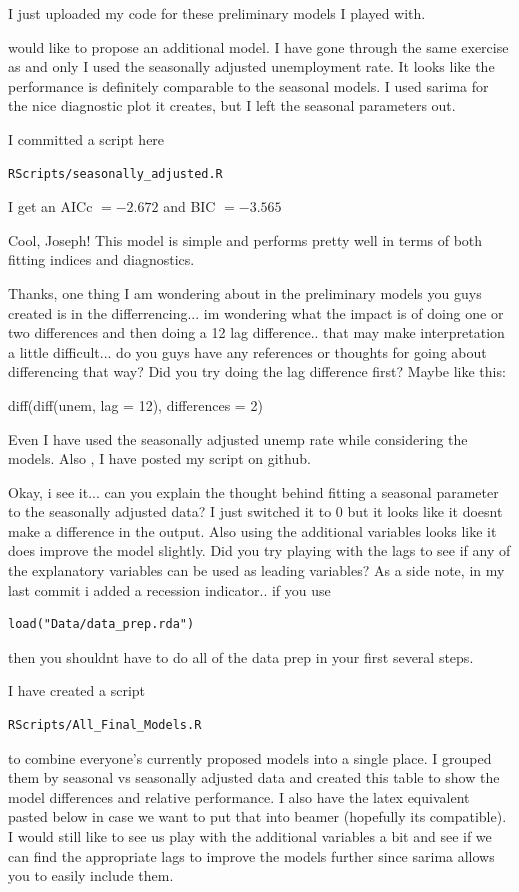 \documentclass[twoside,twocolumn]{article}
\begin{document}
I just uploaded my code for these preliminary models I played with.


 would like to propose an additional model. I have gone through the same exercise as  and \@bopangpsy only I used the seasonally adjusted unemployment rate. It looks like the performance is definitely comparable to the seasonal models. I used sarima for the nice diagnostic plot it creates, but I left the seasonal parameters out.

I committed a script here \begin{verbatim}RScripts/seasonally_adjusted.R\end{verbatim}

I get an AICc \(= -2.672\) and BIC \(= -3.565\)

Cool, Joseph! This model is simple and performs pretty well in terms of
both fitting indices and diagnostics.



Thanks, one thing I am wondering about in the preliminary models you guys created is in the differrencing... im wondering what the impact is of doing one or two differences and then doing a 12 lag difference.. that may make interpretation a little difficult... do you guys have any references or thoughts for going about differencing that way? Did you try doing the lag difference first? Maybe like this:

diff(diff(unem, lag = 12), differences = 2)

Even I have used the seasonally adjusted unemp rate while considering the
models. Also , I have posted my script on github.

Okay, i see it... can you explain the thought behind fitting a seasonal parameter to the seasonally adjusted data? I just switched it to 0 but it looks like it doesnt make a difference in the output. Also using the additional variables looks like it does improve the model slightly. Did you try playing with the lags to see if any of the explanatory variables can be used as leading variables? As a side note, in my last commit i added a recession indicator.. if you use \begin{verbatim}load("Data/data_prep.rda")\end{verbatim} then you shouldnt have to do all of the data prep in your first several steps.

I have created a script \begin{verbatim}RScripts/All_Final_Models.R\end{verbatim} to combine everyone's currently proposed models into a single place. I grouped them by seasonal vs seasonally adjusted data and created this table to show the model differences and relative performance. I also have the latex equivalent pasted below in case we want to put that into beamer (hopefully its compatible). I would still like to see us play with the additional variables a bit and see if we can find the appropriate lags to improve the models further since sarima allows you to easily include them.
\end{document}
